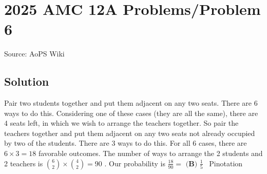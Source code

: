 \documentclass[12pt]{article}
\begin{document}
\section*{{2025 AMC 12A Problems/Problem 6}}
Source: AoPS Wiki

\subsection*{Solution}
Pair two students together and put them adjacent on any two seats. There are 6 ways to do this. Considering one of these cases (they are all the same), there are 4 seats left, in which we wish to arrange the teachers together. So pair the teachers together and put them adjacent on any two seats not already occupied by two of the students. There are 3 ways to do this. For all 6 cases, there are \( 6 \times 3 = 18 \) favorable outcomes. The number of ways to arrange the 2 students and 2 teachers is $\binom{6}{2} \times \binom{4}{2} = 90$ . Our probability is \( \frac{18}{90} = \) $\boxed{\textbf{(B) } \frac 15}$ ~Pinotation
\end{document}
